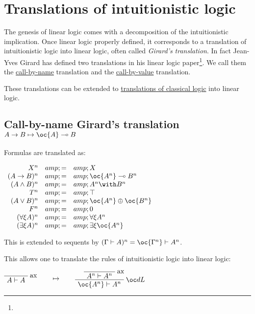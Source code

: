 \chapter{Translations of intuitionistic logic}\label{translations-of-intuitionistic-logic}

The genesis of linear logic comes with a decomposition of the
intuitionistic implication. Once linear logic properly defined, it
corresponds to a translation of intuitionistic logic into linear logic,
often called \emph{Girard's translation}. In fact Jean-Yves Girard has
defined two translations in his linear logic paper\footnote{}. We call
them the \url{call-by-name} translation and the \url{call-by-value}
translation.

These translations can be extended to
\href{translations_of_classical_logic}{translations of classical logic}
into linear logic.

\section{\texorpdfstring{Call-by-name Girard's translation \(A\imp B \mapsto \oc{A}\limp B\)}{Call-by-name Girard's translation A\textbackslash{}imp B \textbackslash{}mapsto \textbackslash{}oc\{A\}\textbackslash{}limp B}}\label{call-by-name-girards-translation-aimp-b-mapsto-ocalimp-b}

Formulas are translated as:

\(\begin{array}{rcl}
X^n &amp; = &amp; X \\
(A\imp B)^n &amp; = &amp; \oc{A^n}\limp B^n \\
(A\wedge B)^n &amp; = &amp; A^n \with B^n \\
T^n &amp; = &amp; \top \\
(A\vee B)^n &amp; = &amp; \oc{A^n}\plus\oc{B^n} \\
F^n &amp; = &amp; \zero \\
(\forall\xi A)^n &amp; = &amp; \forall\xi A^n \\
(\exists\xi A)^n &amp; = &amp; \exists\xi \oc{A^n}
\end{array}\)

This is extended to sequents by
\((\Gamma\vdash A)^n = \oc{\Gamma^n}\vdash A^n\).

This allows one to translate the rules of intuitionistic logic into
linear logic:

\(\LabelRule{\rulename{ax}}
\NulRule{A\vdash A}
\DisplayProof
\qquad\mapsto\qquad
\LabelRule{\rulename{ax}}
\NulRule{A^n\vdash A^n}
\LabelRule{\oc d L}
\UnaRule{\oc{A^n}\vdash A^n}
\DisplayProof\)

